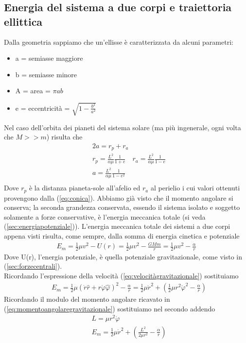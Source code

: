 \documentclass[10pt,a4paper]{article}
\begin{document}
\subsection{Energia del sistema a due corpi e traiettoria ellittica}\label{sec:energiasistema2corpi}
Dalla geometria sappiamo che un'ellisse è caratterizzata da alcuni parametri:
\begin{itemize}
\item a = semiasse maggiore
\item b = semiasse minore
\item A = area = $\pi a b$
\item e = eccentricità = $\sqrt{1-\frac{b^2}{a^2}}$
\end{itemize}
Nel caso dell'orbita dei pianeti del sistema solare (ma più ingenerale, ogni volta che $M >> m$) risulta che
\begin{align*}
&2a = r_p+r_a\\
&r_p = \frac{L^2}{\alpha\mu}\frac{1}{1+e} \quad r_a = \frac{L^2}{\alpha\mu}\frac{1}{1-e}\\
&a = \frac{L^2}{\alpha\mu}\frac{1}{1-e^2}\\
\end{align*}
Dove $r_p$ è la distanza pianeta-sole all'afelio ed $r_a$ al perielio i cui valori ottenuti provengono dalla (\ref{eq:conica}). Abbiamo già visto che il momento angolare si conserva; la seconda grandezza conservata, essendo il sistema isolato e soggetto solamente a forze conservative, è l'energia meccanica totale (si veda (\ref{sec:energiapotenziale})). L'energia meccanica totale dei sistemi a due corpi appena visti risulta, come sempre, dalla somma di energia cinetica e potenziale
 \begin{align*}
 	E_m=\frac{1}{2}\mu v^2 - U(r) = \frac{1}{2}\mu v^2 -\frac{GMm}{r} = \frac{1}{2}\mu v^2 -\frac{\alpha}{r}
 \end{align*}
Dove U(r), l'energia potenziale, è quella potenziale gravitazionale, come visto in (\ref{sec:forzecentrali}).\\
Ricordando l'espressione della velocità (\ref{eq:velocitàgravitazionale}) sostituiamo
\begin{align*}
	&E_m= \frac{1}{2}\mu (\dot{r}\hat{r}+r\dot{\varphi}\hat{\varphi})^2 -\frac{\alpha}{r}= \frac{1}{2}\mu \dot{r}^2+ (\frac{1}{2}\mu r^2\dot{\varphi}^2 -\frac{\alpha}{r})
\end{align*}
Ricordando il modulo del momento angolare ricavato in (\ref{eq:momentoangolaregravitazionale}) sostituiamo nel secondo addendo
\begin{align*}
	&L = \mu r^2 \dot{\varphi}\\
	&E_m= \frac{1}{2}\mu \dot{r}^2+ (\frac{L^2}{2\mu r^2} -\frac{\alpha}{r})
\end{align*}
\end{document}
